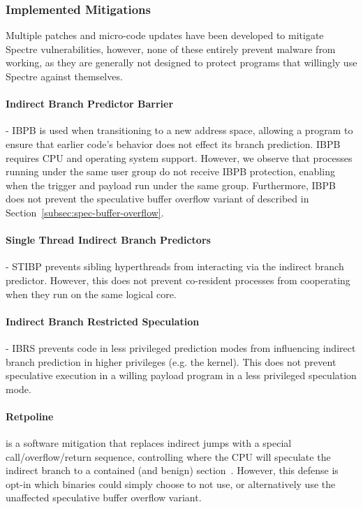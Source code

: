 \subsubsection{Implemented Mitigations}
Multiple patches and micro-code updates have been developed to mitigate Spectre
vulnerabilities, however, none of these entirely prevent \speculake malware from
working, as they are generally not designed to protect programs that willingly
use Spectre against themselves.

\paragraph{Indirect Branch Predictor Barrier} - IBPB is used when transitioning to a new
address space, allowing a
program to ensure that earlier code's behavior does not effect its branch prediction.
IBPB requires CPU and operating system support. However, we observe that
processes running under the same user group do not receive IBPB protection,
enabling \speculake when the trigger and payload run under the same group.
Furthermore, IBPB does not prevent the speculative buffer overflow variant of
\speculake described in Section~\ref{subsec:spec-buffer-overflow}.


\paragraph{Single Thread Indirect Branch Predictors} - STIBP prevents sibling
hyperthreads from interacting via the indirect branch predictor. However, this
does not prevent co-resident processes from cooperating when they run on the same
logical core.

\paragraph{Indirect Branch Restricted Speculation} - IBRS prevents code in less
privileged prediction modes from influencing indirect branch prediction in
higher privileges (e.g. the kernel). This does not
prevent speculative execution in a willing payload program in a less privileged
speculation mode.

\paragraph{Retpoline} is a software mitigation that replaces indirect jumps with
a special call/overflow/return sequence, controlling where the CPU will
speculate the indirect branch to a contained (and benign)
section~\cite{retpoline}. However, this defense is opt-in which \speculake
binaries could simply choose to not use, or alternatively use the unaffected
speculative buffer overflow variant.

